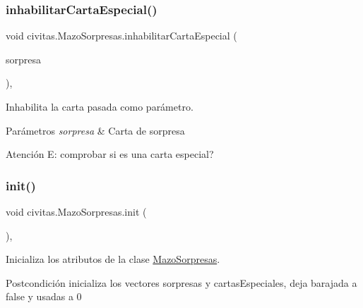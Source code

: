 \subsubsection{\texorpdfstring{inhabilitar\+Carta\+Especial()}{inhabilitarCartaEspecial()}}
{\footnotesize\ttfamily void civitas.\+Mazo\+Sorpresas.\+inhabilitar\+Carta\+Especial (\begin{DoxyParamCaption}\item[{\hyperlink{classcivitas_1_1Sorpresa}{Sorpresa}}]{sorpresa }\end{DoxyParamCaption})\hspace{0.3cm}{\ttfamily [inline]}, {\ttfamily [package]}}



Inhabilita la carta pasada como parámetro. 


\begin{DoxyParams}{Parámetros}
{\em sorpresa} & Carta de sorpresa \\
\hline
\end{DoxyParams}
\begin{DoxyWarning}{Atención}
E\+: comprobar si es una carta especial? 
\end{DoxyWarning}
\mbox{\label{classcivitas_1_1MazoSorpresas_a8a5c58c8a162c9da0088678f3803c7dd}} 
\subsubsection{\texorpdfstring{init()}{init()}}
{\footnotesize\ttfamily void civitas.\+Mazo\+Sorpresas.\+init (\begin{DoxyParamCaption}{ }\end{DoxyParamCaption})\hspace{0.3cm}{\ttfamily [inline]}, {\ttfamily [private]}}



Inicializa los atributos de la clase \hyperlink{classcivitas_1_1MazoSorpresas}{Mazo\+Sorpresas}. 

\begin{DoxyPostcond}{Postcondición}
inicializa los vectores sorpresas y cartas\+Especiales, deja barajada a false y usadas a 0 
\end{DoxyPostcond}
\mbox{\label{classcivitas_1_1MazoSorpresas_a667df8429be1bc4efa89b2d80ec92fa6}} 
